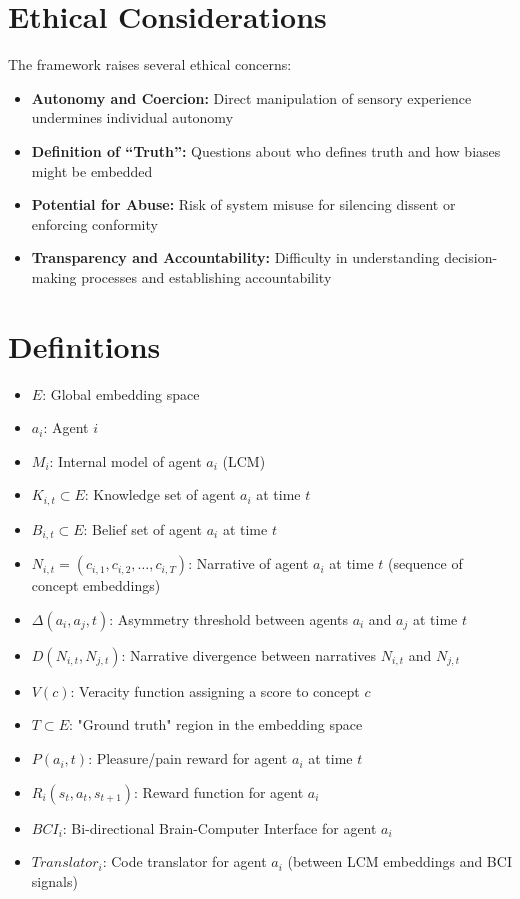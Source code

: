 \documentclass[12pt, a4paper]{article}
\begin{document}
\section{Ethical Considerations}

The framework raises several ethical concerns:

\begin{itemize}
    \item \textbf{Autonomy and Coercion:} Direct manipulation of sensory experience undermines individual autonomy
    \item \textbf{Definition of ``Truth'':} Questions about who defines truth and how biases might be embedded
    \item \textbf{Potential for Abuse:} Risk of system misuse for silencing dissent or enforcing conformity
    \item \textbf{Transparency and Accountability:} Difficulty in understanding decision-making processes and establishing accountability
\end{itemize}

\section{Definitions}

\begin{itemize}
    \item \( E \): Global embedding space
    \item \( a_i \): Agent \( i \)
    \item \( M_i \): Internal model of agent \( a_i \) (LCM)
    \item \( K_{i,t} \subset E \): Knowledge set of agent \( a_i \) at time \( t \)
    \item \( B_{i,t} \subset E \): Belief set of agent \( a_i \) at time \( t \)
    \item \( N_{i,t} = (c_{i,1}, c_{i,2}, \dots, c_{i,T}) \): Narrative of agent \( a_i \) at time \( t \) (sequence of concept embeddings)
    \item \( \Delta(a_i, a_j, t) \): Asymmetry threshold between agents \( a_i \) and \( a_j \) at time \( t \)
    \item \( D(N_{i,t}, N_{j,t}) \): Narrative divergence between narratives \( N_{i,t} \) and \( N_{j,t} \)
    \item \( V(c) \): Veracity function assigning a score to concept \( c \)
    \item \( T \subset E \): "Ground truth" region in the embedding space
    \item \( P(a_i, t) \): Pleasure/pain reward for agent \( a_i \) at time \( t \)
    \item \( R_i(s_t, a_t, s_{t+1}) \): Reward function for agent \( a_i \)
    \item \( BCI_i \): Bi-directional Brain-Computer Interface for agent \( a_i \)
    \item \( Translator_i \): Code translator for agent \( a_i \) (between LCM embeddings and BCI signals)
\end{itemize}
\end{document}
